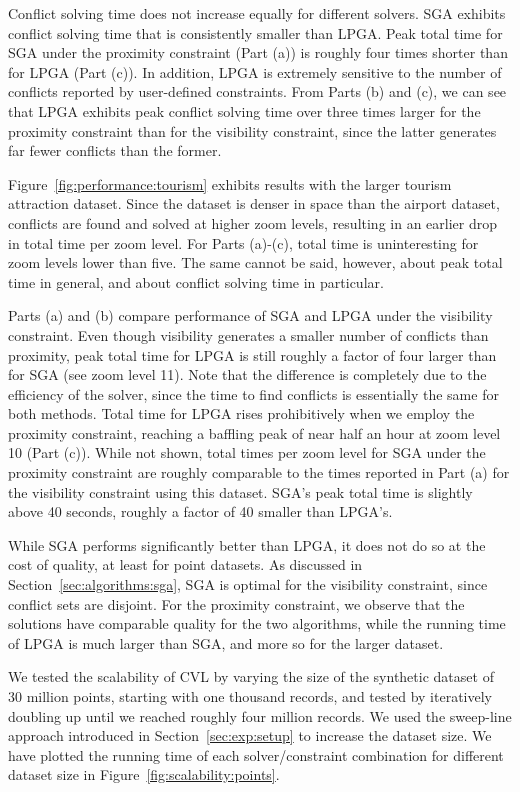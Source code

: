 Conflict solving time does not increase equally for different solvers. SGA exhibits conflict solving time that is consistently smaller than LPGA. Peak total time for SGA under the proximity constraint (Part (a)) is roughly four times shorter than for LPGA (Part (c)). In addition, LPGA is extremely sensitive to the number of conflicts reported by user-defined constraints. From Parts (b) and (c), we can see that LPGA exhibits peak conflict solving time over three times larger for the proximity constraint than for the visibility constraint, since the latter generates far fewer conflicts than the former.

Figure~\ref{fig:performance:tourism} exhibits results with the larger tourism attraction dataset. Since the dataset is denser in space than the airport dataset, conflicts are found and solved at higher zoom levels, resulting in an earlier drop in total time per zoom level. For Parts (a)-(c), total time is uninteresting for zoom levels lower than five. The same cannot be said, however, about peak total time in general, and about conflict solving time in particular.

Parts (a) and (b) compare performance of SGA and LPGA under the visibility constraint. Even though visibility generates a smaller number of conflicts than proximity, peak total time for LPGA is still roughly a factor of four larger than for SGA (see zoom level 11). Note that the difference is completely due to the efficiency of the solver, since the time to find conflicts is essentially the same for both methods. Total time for LPGA rises prohibitively when we employ the proximity constraint, reaching a baffling peak of near half an hour at zoom level 10 (Part (c)). While not shown, total times per zoom level for SGA under the proximity constraint are roughly comparable to the times reported in Part (a) for the visibility constraint using this dataset. SGA's peak total time is slightly above 40 seconds, roughly a factor of 40 smaller than LPGA's.         

While SGA performs significantly better than LPGA, it does not do so at the cost of quality, at least for point datasets. As discussed in Section~\ref{sec:algorithms:sga}, SGA is optimal for the visibility constraint, since conflict sets are disjoint. For the proximity constraint, we observe that the solutions have comparable quality for the two algorithms, while the running time of LPGA is much larger than SGA, and more so for the larger dataset.

We tested the scalability of CVL by varying the size of the synthetic dataset of 30 million points, starting with one thousand records, and tested by iteratively doubling up until we reached roughly four million records. We used the sweep-line approach introduced in Section~\ref{sec:exp:setup} to increase the dataset size. We have plotted the running time of each solver/constraint combination for different dataset size in Figure~\ref{fig:scalability:points}.

